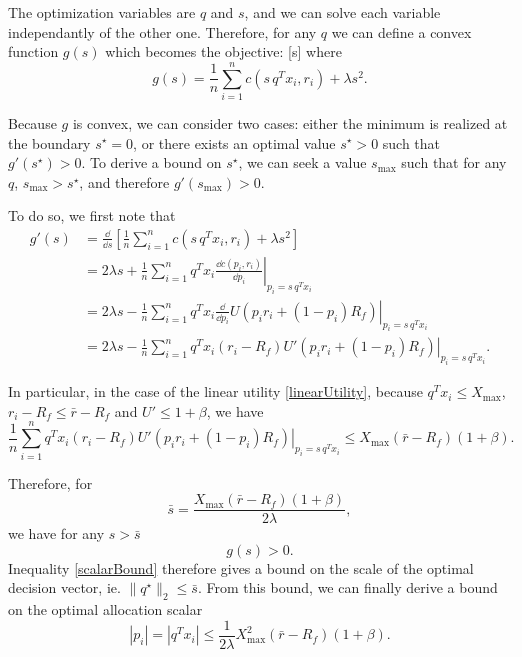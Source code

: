 The optimization variables are $q$ and $s$, and we can solve each variable independantly
of the other one. Therefore, for any $q$ we can define a convex function $g(s)$ which
becomes the objective: [s] where
\begin{equation*}
  g(s) = \frac{1}{n} \sum_{i=1}^n c(s\,q^T x_i, r_i) + \lambda s^2.
\end{equation*}

Because $g$ is convex, we can consider two cases: either the minimum is realized at the
boundary $s^\star=0$, or there exists an optimal value $s^\star > 0$ such that
$g'(s^\star) > 0$. To derive a bound on $s^\star$, we can seek a value $s_{\max}$ such
that for any $q$, $s_{\max} > s^\star$, and therefore $g'(s_{\max}) > 0$.

To do so, we first note that
\begin{align*}
    g'(s) &= \frac{\dd}{\dd s}\left[\frac{1}{n} \sum_{i=1}^n c(s\, q^{T}x_i, r_i) + \lambda s^2\right]\\
          &= 2\lambda s + \frac{1}{n} \sum_{i=1}^n q^{T}x_i \left. \frac{\dd c(p_i,r_i)}{\dd p_i} \right|_{p_i =
            s\,q^{T}x_i} \\
          &= 2\lambda s - \frac{1}{n} \sum_{i=1}^n q^{T}x_i \left. \frac{\dd}{\dd p_i} U(p_i r_i +
            (1-p_i)R_f) \right|_{p_i = s\,q^{T}x_i}\\
          &= 2\lambda s - \frac{1}{n} \sum_{i=1}^n q^{T}x_i (r_i-R_f) \left. U'(p_i r_i +
            (1-p_i)R_f) \right|_{p_i = s\,q^{T}x_i}.
\end{align*}

In particular, in the case of the linear utility \eqref{linearUtility}, because
$q^Tx_i\leq X_{\max}$, $r_i-R_f\leq \bar r - R_f$ and $U'\leq 1+\beta$, we have
\begin{equation*}
  \frac{1}{n} \sum_{i=1}^n q^{T}x_i (r_i-R_f) \left. U'(p_i r_i +
    (1-p_i)R_f) \right|_{p_i = s\,q^{T}x_i} \leq X_{\max}(\bar{r}-R_f)(1+\beta).
\end{equation*}

Therefore, for
\begin{equation}
  \label{scalarBound}
  \bar s = \frac{X_{\max}(\bar r-R_f)(1+\beta)}{2\lambda},
\end{equation}
we have for any $s>\bar s$
\begin{equation*}
  g(s) > 0.
\end{equation*}
Inequality \eqref{scalarBound} therefore gives a bound on the scale of the optimal
decision vector, ie. $\|q^\star\|_2 \leq \bar s$. From this bound, we can finally derive a
bound on the optimal allocation scalar
\begin{equation}
  \label{allocationBound}
  |p_i| = |q^{T}x_i|\leq \frac{1}{2\lambda} X^2_{\max}(\bar r -R_f)(1+\beta).
\end{equation}

